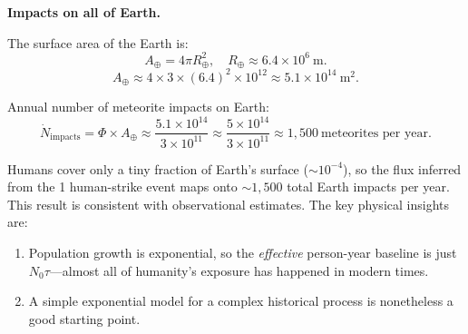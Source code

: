 {\medskip
\textbf{Impacts on all of Earth.}

The surface area of the Earth is:
\[
  A_\oplus = 4\pi R_\oplus^2, \quad R_\oplus \approx 6.4\times10^6\ \text{m}.
\]
\[
  A_\oplus \approx 4\times 3 \times (6.4)^2\times10^{12} \approx 5.1\times10^{14}\ \text{m}^2.
\]

Annual number of meteorite impacts on Earth:
\[
  \dot{N}_\text{impacts} = \Phi\times A_\oplus
  \approx \frac{5.1\times10^{14}}{3\times10^{11}}
  \approx \frac{5\times10^{14}}{3\times10^{11}}
  \approx \boxed{1{,}500\ \text{meteorites per year.}}
\]

\begin{remark}
  Humans cover only a tiny fraction of Earth's surface ($\sim 10^{-4}$), so the flux inferred from the 1 human-strike event maps onto $\sim1{,}500$ total Earth impacts per year. This result is consistent with observational estimates. The key physical insights are:
  \begin{enumerate}
    \item Population growth is exponential, so the \emph{effective} person-year baseline is just $N_0\tau$---almost all of humanity's exposure has happened in modern times.
    \item A simple exponential model for a complex historical process is nonetheless a good starting point.
  \end{enumerate}
\end{remark}}

